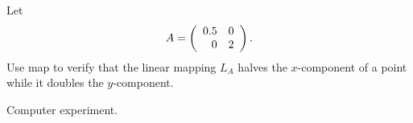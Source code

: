\documentclass{ximera}
\begin{document}
\begin{exercise} \label{c4.3.13}
Let
\[
A = \left(\begin{array}{rr} 0.5 & 0\\ 0 &2\end{array}\right).
\]
Use {\sf map} to verify that the linear mapping $L_A$ halves
the $x$-component of a point while it doubles the $y$-component.

\begin{solution}
Computer experiment.

\end{solution}
\end{exercise}
\end{document}
